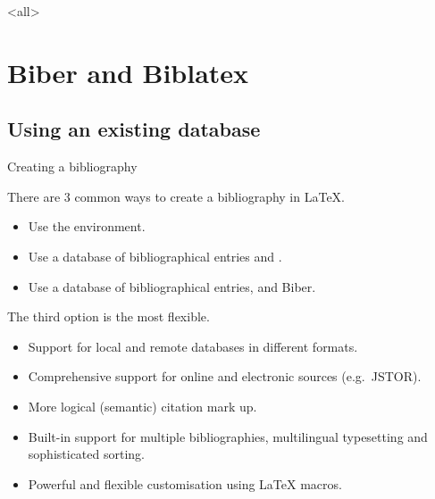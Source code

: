 \mode<all>
\overleaf
\mode*

\section{Biber and Biblatex}

\subsection{Using an existing database}\label{subsec:use-bib}

\begin{frame}{Creating a bibliography}

  There are 3 common ways to create a bibliography in \LaTeX{}.
  \begin{itemize}
    \item Use the  environment.
    \item Use a database of bibliographical entries and \BibTeX{}.
    \item Use a database of bibliographical entries,  and Biber.
  \end{itemize}

  The third option is the most flexible.
  \begin{itemize}
    \item Support for local and remote databases in different formats.
    \item Comprehensive support for online and electronic sources (e.g.~JSTOR).
    \item More logical (semantic) citation mark up.
    \item Built-in support for multiple bibliographies, multilingual typesetting and sophisticated sorting.
    \item Powerful and flexible customisation using \LaTeX{} macros.
  \end{itemize}

\end{frame}

